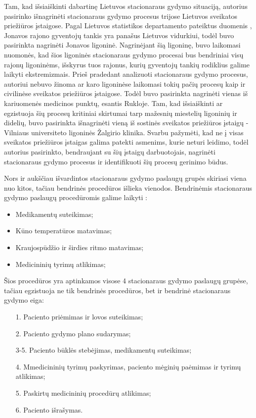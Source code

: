 Tam, kad išsiaiškinti dabartinę Lietuvos stacionaraus gydymo situaciją, autorius pasirinko išnagrinėti stacionaraus gydymo procesus trijose Lietuvos sveikatos priežiūros įstaigose. Pagal Lietuvos statistikos departamento pateiktus duomenis \cite{Gyvento2017}, Jonavos rajono gyventojų tankis yra panašus Lietuvos vidurkiui, todėl buvo pasirinkta nagrinėti Jonavos ligoninė. Nagrinėjant šią ligoninę, buvo laikomasi nuomonės, kad šios ligoninės stacionaraus gydymo procesai bus bendriniai visų rajonų ligoninėms, išskyrus tuos rajonus, kurių gyventojų tankių rodiklius galime laikyti ekstremizmais. Prieš pradedant analizuoti stacionaraus gydymo procesus, autoriui nebuvo žinoma ar karo ligoninėse laikomasi tokių pačių procesų kaip ir civilinėse sveikatos priežiūros įstaigose. Todėl buvo pasirinkta nagrinėti vienas iš kariuomenės medicinos punktų, esantis Rukloje. Tam, kad išsiaiškinti ar egzistuoja šių procesų kritiniai skirtumai tarp mažesnių miestelių ligoninių ir didelių, buvo pasirinkta išnagrinėti vieną iš sostinės sveikatos priežiūros įstaigų - Vilniaus universiteto ligoninės Žalgirio klinika. Svarbu pažymėti, kad ne į visas sveikatos priežiūros įstaigas galima patekti asmenims, kurie neturi leidimo, todėl autorius pasirinkto, bendraujant su šių įstaigų darbuotojais, nagrinėti stacionaraus gydymo procesus ir identifikuoti šių procesų gerinimo būdus.

Nors ir aukščiau išvardintos stacionaraus gydymo paslaugų grupės skiriasi viena nuo kitos, tačiau bendrinės procedūros išlieka vienodos. Bendrinėmis stacionaraus gydymo paslaugų procedūromis galime laikyti \cite{Gautam}: 
\begin{itemize}
    \item Medikamentų suteikimas;
    \item Kūno temperatūros matavimas;
    \item Kraujospūdžio ir širdies ritmo matavimas;
    \item Medicininių tyrimų atlikimas;  
\end{itemize}
Šios procedūros yra aptinkamos visose 4 stacionaraus gydymo paslaugų grupėse, tačiau egzistuoja ne tik bendrinės procedūros, bet ir bendrinė stacionaraus gydymo eiga:
\begin{itemize}
    \item [1.] Paciento priėmimas ir lovos suteikimas;
    \item [2.] Paciento gydymo plano sudarymas;
    \item [3-5.] Paciento būklės stebėjimas, medikamentų suteikimas;
    \item [4.] Mmedicininių tyrimų paskyrimas, paciento mėginių paėmimas ir tyrimų atlikimas;
    \item [5.] Paskirtų medicininių procedūrų atlikimas;
    \item [6.] Paciento išrašymas.
\end{itemize}

